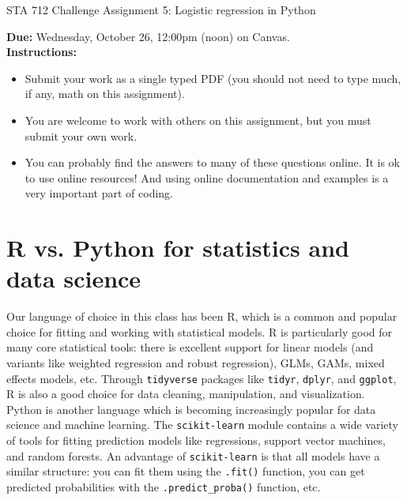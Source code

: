 \documentclass[11pt]{article}
\begin{document}
\begin{center}
\Large
STA 712 Challenge Assignment 5: Logistic regression in Python\\
\normalsize
\vspace{5mm}
\end{center}

\noindent \textbf{Due:} Wednesday, October 26, 12:00pm (noon) on Canvas.\\ 

\noindent \textbf{Instructions:} 
\begin{itemize}
\item Submit your work as a single typed PDF (you should not need to type much, if any, math on this assignment).
\item You are welcome to work with others on this assignment, but you must submit your own work.
\item You can probably find the answers to many of these questions online. It is ok to use online resources! And using online documentation and examples is a very important part of coding.
\end{itemize}

\section*{R vs. Python for statistics and data science}

Our language of choice in this class has been R, which is a common and popular choice for fitting and working with statistical models. R is particularly good for many core statistical tools: there is excellent support for linear models (and variants like weighted regression and robust regression), GLMs, GAMs, mixed effects models, etc. Through \texttt{tidyverse} packages like \texttt{tidyr}, \texttt{dplyr}, and \texttt{ggplot}, R is also a good choice for data cleaning, manipulation, and visualization.\\

\noindent Python is another language which is becoming increasingly popular for data science and machine learning. The \texttt{scikit-learn} module contains a wide variety of tools for fitting prediction models like regressions, support vector machines, and random forests. An advantage of \texttt{scikit-learn} is that all models have a similar structure: you can fit them using the \texttt{.fit()} function, you can get predicted probabilities with the \texttt{.predict\_proba()} function, etc.\\
\end{document}
